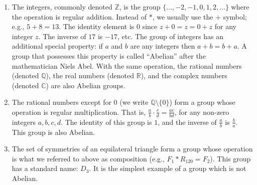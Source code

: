 \documentclass[12 pt]{article}
\begin{document}
\begin{enumerate}[label=$\bullet$]
\item The integers, commonly denoted $\mathbb{Z}$, is the group $\{\hdots,-2,-1,0,1,2,\hdots\}$ where the operation is regular addition. Instead of $*$, we usually use the $+$ symbol; e.g., $5+8=13$. The identity element is $0$ since $z+0=z=0+z$ for any integer $z$. The inverse of $17$ is $-17$, etc. The group of integers has an additional special property: if $a$ and $b$ are any integers then $a+b=b+a$. A group that possesses this property is called ``Abelian'' after the mathematician Niels Abel. With the same operation, the rational numbers (denoted $\mathbb{Q}$), the real numbers (denoted $\mathbb{R}$), and the complex numbers (denoted $\mathbb{C}$) are also Abelian groups. 
\item The rational numbers except for $0$ (we write $\mathbb{Q}\setminus \{0\}$) form a group whose operation is regular multiplication. That is, $\frac{a}{b}\cdot\frac{c}{d} = \frac{ac}{bd}$, for any non-zero integers $a,b,c,d$. The identity of this group is $1$, and the inverse of $\frac{a}{b}$ is $\frac{b}{a}$. This group is also Abelian. 
\item The set of symmetries of an equilateral triangle form a group whose operation is what we referred to above as composition (e.g., $F_1*R_{120}=F_2$). This group has a standard name: $D_3$. It is the simplest example of a group which is not Abelian. 
\end{enumerate}
\end{document}
